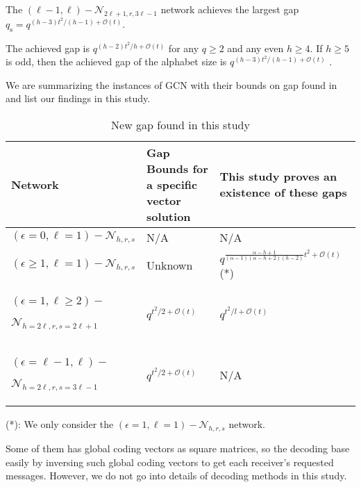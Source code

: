 The $\left(\ell-1,\ell\right)-\mathcal{N}_{2\ell+1,r,3\ell-1}$ network
achieves the largest gap $q_{\mathrm{s}}=q^{(h-3)t^{2}/\left(h-1\right)+\mathcal{O}(t)}$.
\begin{rem}
The achieved gap is $q^{(h-2)t^{2}/h+\mathcal{O}(t)}$ for any $q\geq2$
and any even $h\geq4$. If $h\geq5$ is odd, then the achieved gap
of the alphabet size is $q^{(h-3)t^{2}/\left(h-1\right)+\mathcal{O}(t)}$
\cite{Wachter-Zeh:2018}.
\end{rem}
We are summarizing the instances of GCN with their bounds on gap found
in \cite{Wachter-Zeh:2018} and list our findings in this study.
\begin{table}

\caption{New gap found in this study \label{tab:New-gap-found}}

\begin{centering}
\begin{tabular}{|>{\centering}p{0.15\paperwidth}|>{\centering}p{0.1\paperwidth}|>{\centering}p{0.2\paperwidth}|}
\hline 
\centering{}Network & \centering{}Gap Bounds for a specific vector solution \cite{Wachter-Zeh:2018} & \centering{}This study proves an existence of these gaps\tabularnewline
\hline 
\hline 
\centering{}$\left(\epsilon=0,\ell=1\right)-\mathcal{N}_{h,r,s}$ & \centering{}N/A & \centering{}N/A\tabularnewline
\hline 
\centering{}$\left(\epsilon\geq1,\ell=1\right)-\mathcal{N}_{h,r,s}$ & \centering{}Unknown & \centering{}$q^{\frac{\alpha-h+1}{\left(\alpha-1\right)\left(\alpha-h+2\right)\left(h-2\right)}t^{2}+\mathcal{O}(t)}$
({*})\tabularnewline
\hline 
\begin{centering}
$(\epsilon=1,\ell\geq2)-$
\par\end{centering}
$\mathcal{N}_{h=2\ell,r,s=2\ell+1}$ & \centering{}$q^{t^{2}/2+\mathcal{O}\left(t\right)}$ & \centering{}$q^{t^{2}/l+\mathcal{O}\left(t\right)}$\tabularnewline
\hline 
\begin{centering}
$\left(\epsilon=\ell-1,\ell\right)-$
\par\end{centering}
$\mathcal{N}_{h=2\ell,r,s=3\ell-1}$ & \centering{}$q^{t^{2}/2+\mathcal{O}\left(t\right)}$ & \centering{}N/A\tabularnewline
\hline 
\end{tabular}
\par\end{centering}
\begin{centering}
({*}): We only consider the $\left(\epsilon=1,\ell=1\right)-\mathcal{N}_{h,r,s}$
network.
\par\end{centering}
\end{table}
Some of them has global coding vectors as square matrices, so the
decoding base easily by inversing such global coding vectors to get
each receiver's requested messages. However, we do not go into details
of decoding methods in this study.

\clearpage